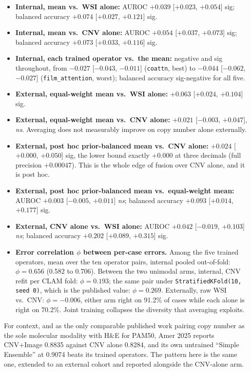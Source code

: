 \documentclass[10pt,a4paper]{article}
\begin{document}
\begin{itemize}
\setlength{\itemsep}{1pt}
\item \textbf{Internal, mean vs.\ WSI alone:} AUROC $+0.039$ [$+0.023$, $+0.054$] sig; balanced
accuracy $+0.074$ [$+0.027$, $+0.121$] sig.
\item \textbf{Internal, mean vs.\ CNV alone:} AUROC $+0.054$ [$+0.037$, $+0.073$] sig; balanced
accuracy $+0.073$ [$+0.033$, $+0.116$] sig.
\item \textbf{Internal, each trained operator vs.\ the mean:} negative and sig throughout, from
$-0.027$ [$-0.043$, $-0.011$] (\texttt{coattn}, best) to $-0.044$ [$-0.062$, $-0.027$]
(\texttt{film\_attention}, worst); balanced accuracy sig-negative for all five.
\item \textbf{External, equal-weight mean vs.\ WSI alone:} $+0.063$ [$+0.024$, $+0.104$] sig.
\item \textbf{External, equal-weight mean vs.\ CNV alone:} $+0.021$ [$-0.003$, $+0.047$],
\emph{ns}. Averaging does not measurably improve on copy number alone externally.
\item \textbf{External, post hoc prior-balanced mean vs.\ CNV alone:} $+0.024$ [$+0.000$,
$+0.050$] sig, the lower bound exactly $+0.000$ at three decimals (full precision $+0.00047$).
This is the whole edge of fusion over CNV alone, and it is post hoc.
\item \textbf{External, post hoc prior-balanced mean vs.\ equal-weight mean:} AUROC $+0.003$
[$-0.005$, $+0.011$] \emph{ns}; balanced accuracy $+0.093$ [$+0.014$, $+0.177$] sig.
\item \textbf{External, CNV alone vs.\ WSI alone:} AUROC $+0.042$ [$-0.019$, $+0.103$]
\emph{ns}; balanced accuracy $+0.202$ [$+0.089$, $+0.315$] sig.
\item \textbf{Error correlation $\phi$ between per-case errors.} Among the five trained operators,
mean over the ten operator pairs, internal pooled out-of-fold: $\phi = 0.656$ (0.582 to 0.706).
Between the two unimodal arms, internal, CNV refit per CLAM fold: $\phi = 0.193$; the same pair
under \texttt{StratifiedKFold(10, seed 0)}, which is the published value: $\phi = 0.269$.
Externally, raw WSI vs.\ CNV: $\phi = -0.006$, either arm right on 91.2\% of cases while each
alone is right on 70.2\%. Joint training collapses the diversity that averaging exploits.
\end{itemize}

For context, and as the only comparable published work pairing copy number as the sole molecular
modality with H\&E for PAM50, Amer 2025 reports CNV+Image 0.8835 against CNV alone 0.8284, and its
own untrained ``Simple Ensemble'' at 0.9074 beats its trained operators. The pattern here is the
same one, extended to an external cohort and reported alongside the CNV-alone arm.
\end{document}
